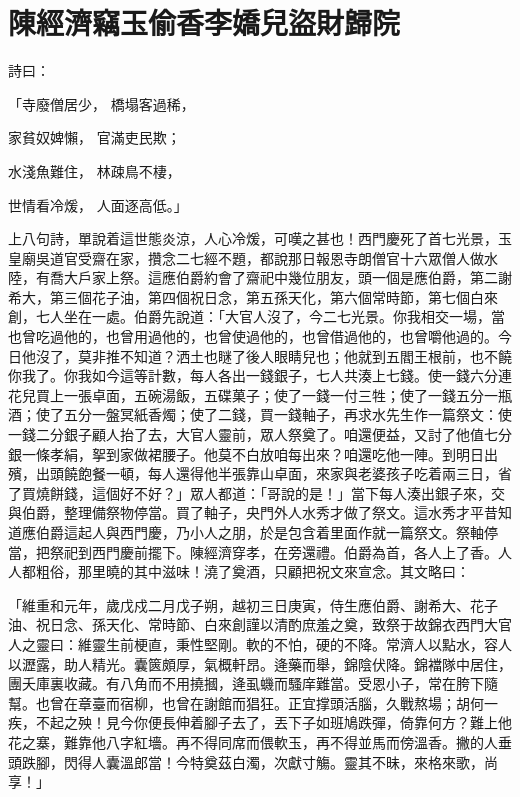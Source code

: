 %

\chapter{陳經濟竊玉偷香\KG 李嬌兒盜財歸院}


\begin{showcontents}{}



詩曰：

「寺廢僧居少，  橋塌客過稀，

家貧奴婢懶，  官滿吏民欺；

水淺魚難住，  林疎鳥不棲，

世情看冷煖，  人面逐高低。」

上八句詩，單說着這世態炎涼，人心冷煖，可嘆之甚也！西門慶死了首七光景，玉皇廟吳道官受齋在家，攢念二七經不題，都說那日報恩寺朗僧官十六眾僧人做水陸，有喬大戶家上祭。這應伯爵約會了齋祀中幾位朋友，頭一個是應伯爵，第二謝希大，第三個花子油，第四個祝日念，第五孫天化，第六個常時節，第七個白來創，七人坐在一處。伯爵先說道：「大官人沒了，今二七光景。你我相交一場，當也曾吃過他的，也曾用過他的，也曾使過他的，也曾借過他的，也曾嚼他過的。今日他沒了，莫非推不知道？洒土也瞇了後人眼睛兒也；他就到五閻王根前，也不饒你我了。你我如今這等計數，每人各出一錢銀子，七人共湊上七錢。使一錢六分連花兒買上一張卓面，五碗湯飯，五碟菓子；使了一錢一付三牲；使了一錢五分一瓶酒；使了五分一盤冥紙香燭；使了二錢，買一錢軸子，再求水先生作一篇祭文：使一錢二分銀子顧人抬了去，大官人靈前，眾人祭奠了。咱還便益，又討了他值七分銀一條孝絹，挐到家做裙腰子。他莫不白放咱每出來？咱還吃他一陣。到明日出殯，出頭饒飽餐一頓，每人還得他半張靠山卓面，來家與老婆孩子吃着兩三日，省了買燒餅錢，這個好不好？」眾人都道：「哥說的是！」當下每人湊出銀子來，交與伯爵，整理備祭物停當。買了軸子，央門外人水秀才做了祭文。這水秀才平昔知道應伯爵這起人與西門慶，乃小人之朋，於是包含着里面作就一篇祭文。祭軸停當，把祭祀到西門慶前擺下。陳經濟穿孝，在旁還禮。伯爵為首，各人上了香。人人都粗俗，那里曉的其中滋味！澆了奠酒，只顧把祝文來宣念。其文略曰：

「維重和元年，歲戊戍二月戊子朔，越初三日庚寅，侍生應伯爵、謝希大、花子油、祝日念、孫天化、常時節、白來創謹以清酌庶羞之奠，致祭于故錦衣西門大官人之靈曰：維靈生前梗直，秉性堅剛。軟的不怕，硬的不降。常濟人以點水，容人以瀝露，助人精光。囊篋頗厚，氣概軒昂。逄藥而舉，錦陰伏降。錦襠隊中居住，團夭庫裏收藏。有八角而不用撓摑，逄虱蟣而騷庠難當。受恩小子，常在胯下隨幫。也曾在章臺而宿柳，也曾在謝館而猖狂。正宜撑頭活腦，久戰熬場；胡何一疾，不起之殃！見今你便長伸着腳子去了，丟下子如班鳩跌彈，倚靠何方？難上他花之寨，難靠他八字紅墻。再不得同席而偎軟玉，再不得並馬而傍溫香。撇的人垂頭跌腳，閃得人囊溫郎當！今特奠茲白濁，次獻寸觴。靈其不昧，來格來歌，尚享！」


\end{showcontents}
